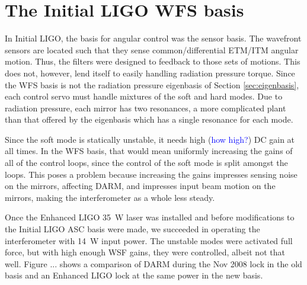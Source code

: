 




\section{The Initial LIGO WFS basis}
In Initial LIGO, the basis for angular control was the sensor
basis. The wavefront sensors are located such that they sense
common/differential ETM/ITM angular motion. Thus, the filters were
designed to feedback to those sets of motions. This does not, however,
lend itself to easily handling radiation pressure torque. Since the
WFS basis is not the radiation pressure eigenbasis of Section
\ref{sec:eigenbasis}, each control servo must handle mixtures of the
soft and hard modes. Due to radiation pressure, each mirror has two
resonances, a more complicated plant than that offered by the
eigenbasis which has a single resonance for each mode. 

Since the soft mode is statically unstable, it needs high
(\textcolor{blue}{how high?}) DC gain at all times. In the WFS basis,
that would mean uniformly increasing the gains of all of the control
loops, since the control of the soft mode is split amongst the
loops. This poses a problem because increasing the gains impresses
sensing noise on the mirrors, affecting DARM, and impresses input beam
motion on the mirrors, making the interferometer as a whole less
steady. 

Once the Enhanced LIGO 35~W laser was installed and before
modifications to the Initial LIGO ASC basis were made, we succeeded in
operating the interferometer with 14~W input power. The unstable modes
were activated full force, but with high enough WSF gains, they were
controlled, albeit not that well. Figure ... shows a comparison of
DARM during the Nov 2008 lock in the old basis and an Enhanced LIGO
lock at the same power in the new basis. 



